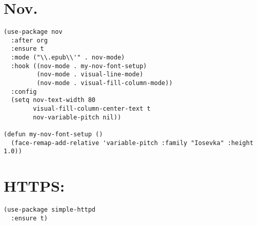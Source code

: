 \documentclass[11pt]{article}
\begin{document}
\section{Nov.}
\label{sec:org919098a}
\begin{verbatim}
(use-package nov
  :after org
  :ensure t
  :mode ("\\.epub\\'" . nov-mode)
  :hook ((nov-mode . my-nov-font-setup)
         (nov-mode . visual-line-mode)
         (nov-mode . visual-fill-column-mode))
  :config
  (setq nov-text-width 80
        visual-fill-column-center-text t
        nov-variable-pitch nil))

(defun my-nov-font-setup ()
  (face-remap-add-relative 'variable-pitch :family "Iosevka" :height 1.0))
\end{verbatim}
\section{HTTPS:}
\label{sec:orgff7d53e}
\begin{verbatim}
(use-package simple-httpd
  :ensure t)
\end{verbatim}
\end{document}
